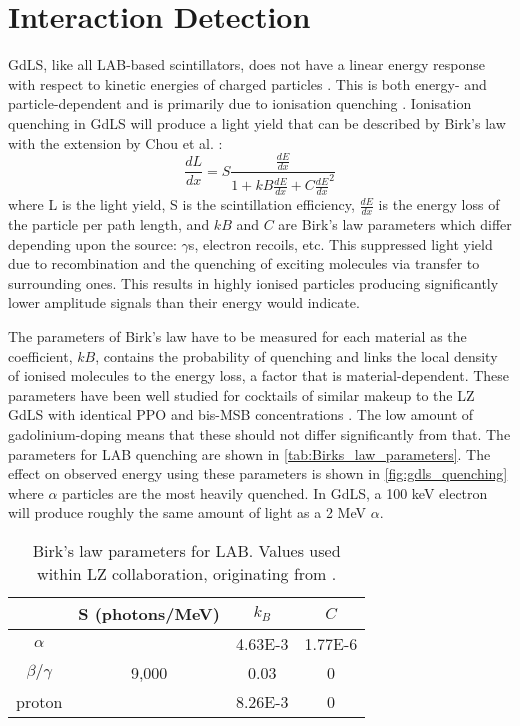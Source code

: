 \section{Interaction Detection}
\label{sec:od_physics}
\par
GdLS, like all LAB-based scintillators, does not have a linear energy response with respect to kinetic energies of charged particles \cite{nonlinear_gdls_ref}.
This is both energy- and particle-dependent and is primarily due to ionisation quenching \cite{lab_quenching_theory_ref}.
Ionisation quenching in GdLS will produce a light yield that can be described by Birk's law \cite{birks_law_ref} with the extension by Chou et al. \cite{generalised_birks_ref}:
\begin{equation} 
    \frac{dL}{dx} = S \frac{\frac{dE}{dx}}{1 + kB\frac{dE}{dx} + C\frac{dE}{dx}^2}
    \label{eq:birkslaw}
\end{equation}
where L is the light yield, S is the scintillation efficiency, $\frac{dE}{dx}$ is the energy loss of the particle per path length, and $kB$ and $C$ are Birk's law parameters which differ depending upon the source: $\gamma$s, electron recoils, etc.
This suppressed light yield due to recombination and the quenching of exciting molecules via transfer to surrounding ones.
This results in highly ionised particles producing significantly lower amplitude signals than their energy would indicate.

\par
The parameters of Birk's law have to be measured for each material as the coefficient, $kB$, contains the probability of quenching and links the local density of ionised molecules to the energy loss, a factor that is material-dependent. 
These parameters have been well studied for cocktails of similar makeup to the LZ GdLS with identical PPO and bis-MSB concentrations \cite{ls_alpha_quenching_ref,ls_proton_quenching_ref}.
The low amount of gadolinium-doping means that these should not differ significantly from that.
The parameters for LAB quenching are shown in \autoref{tab:Birks_law_parameters}.
The effect on observed energy using these parameters is shown in \autoref{fig:gdls_quenching} where $\alpha$ particles are the most heavily quenched.
In GdLS, a 100 keV electron will produce roughly the same amount of light as a 2 MeV $\alpha$.

\begin{table}[]
    \centering
    \begin{tabular}{c | c | c | c }
                   & S (photons/MeV) & $k_{B}$ & $C$ \\ \hline
    $\alpha$       &                 & 4.63E-3 & 1.77E-6 \\
    $\beta/\gamma$ & 9,000           & 0.03    & 0 \\ 
    proton         &                 & 8.26E-3 & 0
    \end{tabular}
    \caption{Birk's law parameters for LAB. Values used within LZ collaboration, originating from \cite{ls_proton_quenching_ref}.}
    \label{tab:Birks_law_parameters}
\end{table} 

